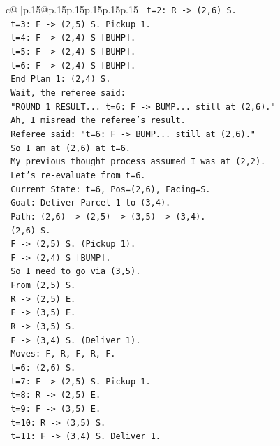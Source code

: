 \documentclass{article}
\begin{document}
{\begin{supertabular}{c@{$\;$}|p{.15\linewidth}@{}p{.15\linewidth}p{.15\linewidth}p{.15\linewidth}p{.15\linewidth}p{.15\linewidth}}
{{{\texttt{   t=2: R {-}> (2,6) S.} \\
\texttt{   t=3: F {-}> (2,5) S. Pickup 1.} \\
\texttt{   t=4: F {-}> (2,4) S {[}BUMP{]}.} \\
\texttt{   t=5: F {-}> (2,4) S {[}BUMP{]}.} \\
\texttt{   t=6: F {-}> (2,4) S {[}BUMP{]}.} \\
\texttt{   End Plan 1: (2,4) S.} \\
\texttt{   Wait, the referee said:} \\
\texttt{   "ROUND 1 RESULT... t=6: F {-}> BUMP... still at (2,6)."} \\
\texttt{   Ah, I misread the referee's result.} \\
\texttt{   Referee said: "t=6: F {-}> BUMP... still at (2,6)."} \\
\texttt{   So I am at (2,6) at t=6.} \\
\texttt{   My previous thought process assumed I was at (2,2).} \\
\texttt{   Let's re{-}evaluate from t=6.} \\
\texttt{   Current State: t=6, Pos=(2,6), Facing=S.} \\
\texttt{   Goal: Deliver Parcel 1 to (3,4).} \\
\texttt{   Path: (2,6) {-}> (2,5) {-}> (3,5) {-}> (3,4).} \\
\texttt{   (2,6) S.} \\
\texttt{   F {-}> (2,5) S. (Pickup 1).} \\
\texttt{   F {-}> (2,4) S {[}BUMP{]}.} \\
\texttt{   So I need to go via (3,5).} \\
\texttt{   From (2,5) S.} \\
\texttt{   R {-}> (2,5) E.} \\
\texttt{   F {-}> (3,5) E.} \\
\texttt{   R {-}> (3,5) S.} \\
\texttt{   F {-}> (3,4) S. (Deliver 1).} \\
\texttt{   Moves: F, R, F, R, F.} \\
\texttt{   t=6: (2,6) S.} \\
\texttt{   t=7: F {-}> (2,5) S. Pickup 1.} \\
\texttt{   t=8: R {-}> (2,5) E.} \\
\texttt{   t=9: F {-}> (3,5) E.} \\
\texttt{   t=10: R {-}> (3,5) S.} \\
\texttt{   t=11: F {-}> (3,4) S. Deliver 1.} \\
}}}
\end{supertabular}}
\end{document}
